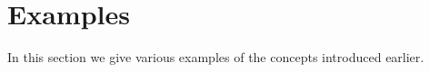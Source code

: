 \section{Examples}
\label{sec:examples}

In this section we give various examples of the concepts introduced earlier.

